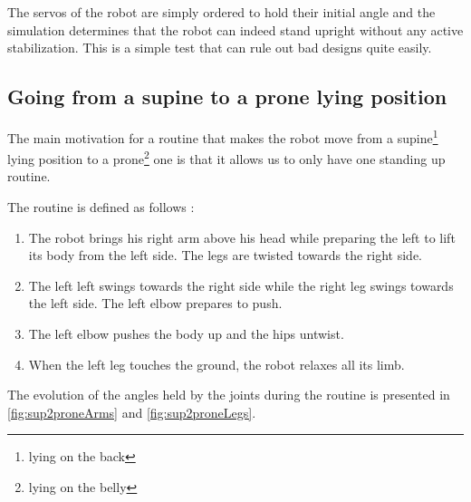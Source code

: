 The servos of the robot are simply ordered to hold their initial angle and the simulation determines that the robot can indeed stand upright without any active stabilization. This is a simple test that can rule out bad designs quite easily.

\subsection{Going from a supine to a prone lying position}
The main motivation for a routine that makes the robot move from a supine\footnote{lying on the back} lying position to a prone\footnote{lying on the belly} one is that it allows us to only have one standing up routine. 

The routine is defined as follows :\begin{enumerate}
\item The robot brings his right arm above his head while preparing the left to lift its body from the left side. The legs are twisted towards the right side.

\item The left left swings towards the right side while the right leg swings towards the left side. The left elbow prepares to push.

\item The left elbow pushes the body up and the hips untwist.

\item When the left leg touches the ground, the robot relaxes all its limb.
\end{enumerate}

The evolution of the angles held by the joints during the routine is presented in \cref{fig:sup2proneArms} and \cref{fig:sup2proneLegs}. 

